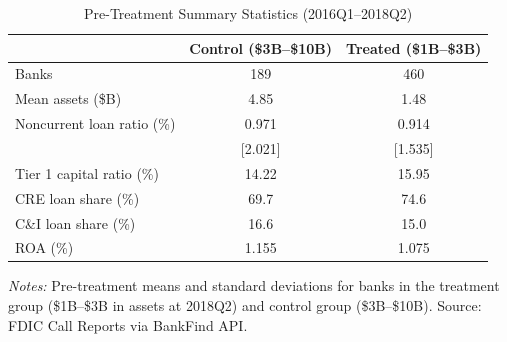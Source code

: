 \begin{table}[t]
\centering
\caption{Pre-Treatment Summary Statistics (2016Q1--2018Q2)}
\label{tab:summary}
\small
\begin{threeparttable}
\begin{tabular}{lcc}
\toprule
 & Control (\$3B--\$10B) & Treated (\$1B--\$3B) \\
\midrule
Banks & 189 & 460 \\
Mean assets (\$B) & 4.85 & 1.48 \\
\addlinespace
Noncurrent loan ratio (\%) & 0.971 & 0.914 \\
\quad [SD] & [2.021] & [1.535] \\
Tier 1 capital ratio (\%) & 14.22 & 15.95 \\
CRE loan share (\%) & 69.7 & 74.6 \\
C\&I loan share (\%) & 16.6 & 15.0 \\
ROA (\%) & 1.155 & 1.075 \\
\bottomrule
\end{tabular}
\begin{tablenotes}
\item \textit{Notes:} Pre-treatment means and standard deviations for banks in the treatment group (\$1B--\$3B in assets at 2018Q2) and control group (\$3B--\$10B). Source: FDIC Call Reports via BankFind API.
\end{tablenotes}
\end{threeparttable}
\end{table}
